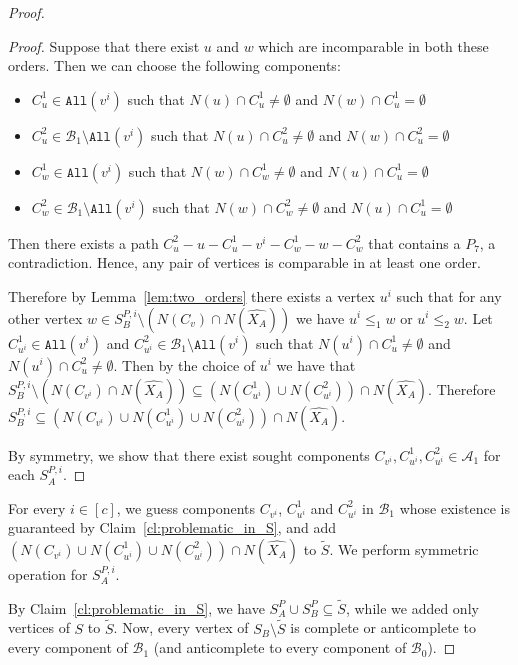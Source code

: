 \documentclass[11pt,a4paper]{article}
\theoremstyle{definition}
\renewcommand{\varnothing}{\emptyset}
\begin{document}
\begin{proof}
\begin{proof}
    Suppose that there exist $u$ and $w$ which are incomparable in both these orders. Then we can choose the following components:
    \begin{itemize}
        \item $C_u^1\in \texttt{All}({v^i})$ such that $N(u)\cap C_u^1\neq \varnothing$ and $N(w)\cap C_u^1=\varnothing$
        \item $C_u^2\in \mathcal{B}_1 \setminus \texttt{All}({v^i})$ such that $N(u)\cap C_u^2\neq \varnothing$ and $N(w)\cap C_u^2=\varnothing$
        \item $C_w^1\in \texttt{All}({v^i})$ such that $N(w)\cap C_w^1\neq \varnothing$ and $N(u)\cap C_u^1=\varnothing$
        \item $C_w^2\in  \mathcal{B}_1 \setminus \texttt{All}({v^i})$ such that $N(w)\cap C_w^2\neq \varnothing$ and $N(u)\cap C_u^1=\varnothing$
    \end{itemize}
    Then there exists a path $C_u^2-u-C_u^1-{v^i}-C_w^1-w-C_w^2$ that contains a $P_7$, a contradiction. Hence, any pair of vertices is comparable in at least one order. 
    
    Therefore by Lemma~\ref{lem:two_orders} there exists a vertex ${u^i}$ such that for any other vertex $w\in S_B^{P,i}\setminus (N(C_v)\cap N(\widehat{X_A}))$ we have ${u^i}\leq_1 w$ or ${u^i}\leq_2 w$. Let $C_{u^i}^1\in \texttt{All}({v^i})$ and $C_{u^i}^2\in \mathcal{B}_1\setminus\texttt{All}({v^i})$ such that $N({u^i})\cap C_u^1\neq \varnothing$ and $N({u^i})\cap C_u^2\neq \varnothing$. Then by the choice of ${u^i}$ we have that $S_B^{P,i}\setminus (N(C_{v^i})\cap N(\widehat{X_A}))\subseteq (N(C_{u^i}^1)\cup N(C_{u^i}^2))\cap N(\widehat{X_A})$. Therefore $S_B^{P,i}\subseteq \left(N(C_{v^i})\cup N(C_{u^i}^1)\cup N(C_{u^i}^2)\right)\cap N(\widehat{X_A})$.  

    By symmetry, we show that there exist sought components $C_{v^i}, C_{u^i}^1, C_{u^i}^2\in \mathcal{A}_1$ for each $S_A^{P,i}$.
\end{proof}
For every $i \in [c]$, 
we guess components $C_{v^i}$, $C_{u^i}^1$ and $C_{u^i}^2$ 
in $\mathcal{B}_1$ whose existence is guaranteed by Claim~\ref{cl:problematic_in_S},
and add $\left(N(C_{v^i})\cup N(C_{u^i}^1)\cup N(C_{u^i}^2)\right)\cap N(\widehat{X_A})$
to $\widetilde{S}$. We perform symmetric operation for $S_A^{P,i}$. 

By Claim~\ref{cl:problematic_in_S}, we have $S_A^P \cup S_B^P \subseteq \widetilde{S}$, while
we added only vertices of $S$ to $\widetilde{S}$. 
Now, every vertex of $S_B \setminus \widetilde{S}$ is complete or anticomplete
to every component of $\mathcal{B}_1$ (and anticomplete to every component of $\mathcal{B}_0$). 


\end{proof}
\end{document}
